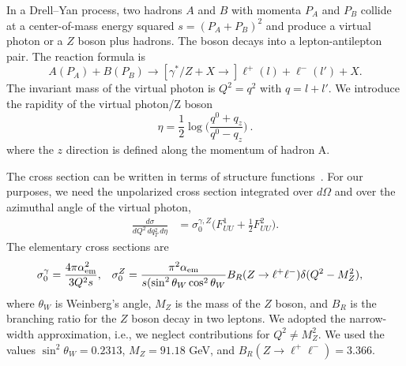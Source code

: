 \documentclass[aps,preprintnumbers,showpacs,nofootinbib,superscriptaddress,floatfix]{revtex4}
\begin{document}
In a Drell--Yan process, two hadrons $A$ and $B$ with momenta $P_A$ and $P_B$
collide at a center-of-mass energy squared $s = (P_A + P_B)^2$ 
and produce a virtual photon or a $Z$ boson plus hadrons. 
The boson decays into a
lepton-antilepton pair. The reaction formula is
\begin{equation}
A(P_A)+B(P_B)\to [\gamma^*/Z + X \to] \ell^+(l) + \ell^-(l') + X.
\end{equation} 
The invariant mass of the virtual photon is $Q^2=q^2$ with $q = l + l'$. 
We introduce the rapidity of the virtual photon/Z boson
\begin{equation}
\eta=\frac{1}{2}\log\bigg(\frac{q^0+q_z}{q^0-q_z}\bigg)\  .
\end{equation} 
where the $z$ direction is defined along the momentum of hadron A.

The cross section can be written in terms of structure
functions~\cite{Boer:2006eq,Arnold:2008kf}. For our purposes, we need the unpolarized 
cross section
integrated over $d\Omega$ and over the azimuthal angle of the virtual photon, 
\begin{align}
\frac{d\sigma}{dQ^2\, dq_T^2\,d\eta} &= \sigma_0^{\gamma,Z}
\bigg(F_{UU}^1 + \frac{1}{2} F_{UU}^2\bigg). 
\end{align} 
The elementary cross sections are
\begin{align}
\sigma_0^{\gamma} &= \frac{4\pi \alpha^2_{\rm em}}{3 Q^2 s},
&
\sigma_0^Z &= 
\frac{\pi^2 \alpha_{\rm em}}{s (\sin^2{\theta_W} \cos^2{\theta_W}}
B_R(Z\rightarrow \ell^+\ell^-)
\delta(Q^2 - M_Z^2), 
\end{align} 
where $\theta_W$ is Weinberg's angle, $M_Z$ is the mass of the $Z$ boson, and
$B_R$ is the branching ratio for the $Z$ boson decay in two leptons.
We adopted the narrow-width approximation, i.e., we neglect contributions for 
$Q^2 \neq M_Z^2$. 
We used the values 
$\sin^2 \theta_W= 0.2313$, $M_Z = 91.18$ GeV, and 
$B_R(Z\rightarrow \ell^+\ell^-)=3.366$.  
\end{document}
